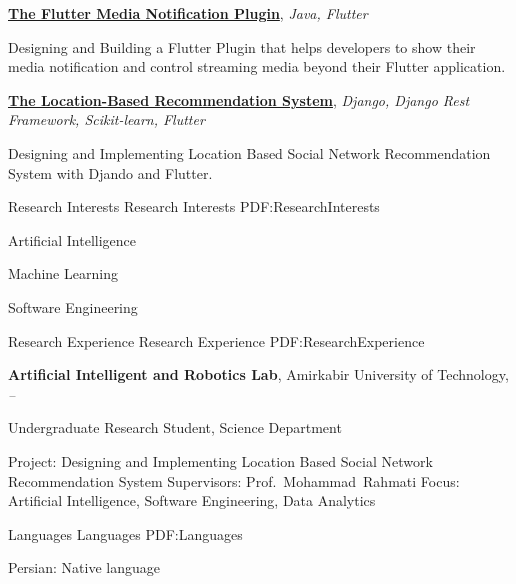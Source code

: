 \documentclass[letterpaper,MMMyyyy,nonstopmode]{resume}
\begin{document}
\begin{Body}
\BigGap
\BulletItem
\href{https://github.com/aliyazdi75/flutter_media_notification}
{\textbf{The Flutter Media Notification Plugin}},
\textit{\small{Java, Flutter}}
\begin{Detail}
\SubBulletItem
Designing and Building a Flutter Plugin that helps developers to show their media notification and control streaming media beyond their Flutter application.
\end{Detail}

\BigGap
\BulletItem
\href{https://github.com/aliyazdi75/Resume/raw/master/BScThesis-Abstract.pdf}
{\textbf{The Location-Based Recommendation System}},
\textit{\small{Django, Django Rest Framework, Scikit-learn, Flutter}}
\begin{Detail}
\SubBulletItem
Designing and Implementing Location Based Social Network Recommendation System with Djando and Flutter.
\end{Detail}

\newpage


\Section
{Research Interests}
{Research Interests}
{PDF:ResearchInterests}

\BigGap
\BulletItem
Artificial Intelligence

\Gap
\BulletItem
Machine Learning

\Gap
\BulletItem
Software Engineering


\Section
{Research Experience}
{Research Experience}
{PDF:ResearchExperience}

\Entry
\textbf{Artificial Intelligent and Robotics Lab},
Amirkabir University of Technology,
\hfill
\textsl{\small{ -- }}

\Gap
\BulletItem
Undergraduate Research Student, Science Department
\begin{Detail}
\SubBulletItem
Project:
Designing and Implementing Location Based Social Network Recommendation System
\SubBulletItem
Supervisors:
Prof.~Mohammad~Rahmati
\SubBulletItem
Focus: Artificial Intelligence, Software Engineering, Data Analytics
\end{Detail}


\Section
{Languages}
{Languages}
{PDF:Languages}

\BigGap
\BulletItem
Persian: Native language


\end{Body}
\end{document}

